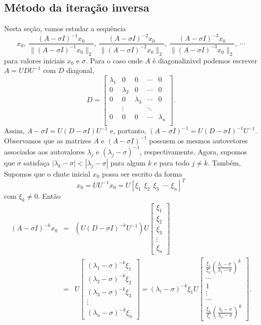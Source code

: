 \subsection{Método da iteração inversa}
Nesta seção, vamos estudar a sequência
\begin{equation}
x_0,\ \frac{(A-\sigma I)^{-1}x_0}{\|(A-\sigma I)^{-1}x_0\|_2},\ \frac{(A-\sigma I)^{-2}x_0}{\|(A-\sigma I)^{-2}x_0\|_2},\ \frac{(A-\sigma I)^{-3}x_0}{\|(A-\sigma I)^{-3}x_0\|_2},\ \cdots
\end{equation}
para valores iniciais $x_0$ e $\sigma$. Para o caso onde $A$ é diagonalizável podemos escrever $A=UDU^{-1}$ com $D$ diagonal,
\begin{equation}
D=\left[\begin{array}{ccccc}
\lambda_1&0&0&\cdots&0\\
0&\lambda_2&0&\cdots&0\\
0&  0&\lambda_3&\cdots&0\\
 &\vdots& &\ddots&\\
 0&  0&0&\cdots&\lambda_n\\
\end{array}\right].
\end{equation}
Assim, $A-\sigma I=U(D-\sigma I)U^{-1}$ e, portanto, $(A-\sigma I)^{-1}=U(D-\sigma I)^{-1}U^{-1}$. Observamos que as matrizes $A$ e $(A-\sigma I)^{-1}$ possuem os mesmos autovetores associados aos autovalores $\lambda_j$ e $(\lambda_j-\sigma)^{-1}$, respectivamente. Agora, supomos que $\sigma$ satisfaça $|\lambda_k-\sigma|<|\lambda_j-\sigma|$ para algum $k$ e para todo $j\neq k$.  Também, Supomos que o chute inicial $x_0$ possa ser escrito da forma
\begin{equation}
x_0=UU^ {-1}x_0=U[\xi_1\ \ \xi_2\ \ \xi_3\ \ \cdots \ \ \xi_n]^T
\end{equation}
com $\xi_k\neq 0$. Então
\begin{eqnarray}
(A-\sigma I)^{-k}x_0&=&(U(D-\sigma I)^{-k }U^{-1} )U\left[\begin{array}{c}\xi_1\\ \xi_2\\ \xi_3\\ \vdots \\ \xi_n\end{array}\right]\\&=&U\left[\begin{array}{c}(\lambda_1-\sigma)^{-k}\xi_1\\ (\lambda_2-\sigma)^{-k}\xi_2\\ (\lambda_3-\sigma)^{-k}\xi_3\\ \vdots \\ (\lambda_n-\sigma)^{-k}\xi_n\end{array}\right]=(\lambda_i-\sigma)^{-k}\xi_1U\left[\begin{array}{c}\frac{\xi_1}{\xi_i}\left(\frac{\lambda_i-\sigma}{\lambda_1-\sigma}\right)^k\\ \cdots\\ 1\\ \vdots \\ \cdots \\ \frac{\xi_n}{\xi_i}\left(\frac{\lambda_i-\sigma}{\lambda_n-\sigma}\right)^k \end{array}\right].
\end{eqnarray}
